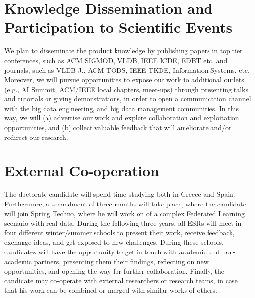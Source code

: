 \documentclass[12pt]{article}
\begin{document}
\section{Knowledge Dissemination and Participation to Scientific Events}

We plan to disseminate the product knowledge by publishing papers in top tier conferences, such as ACM
SIGMOD, VLDB, IEEE ICDE, EDBT etc. and journals, such as VLDB J., ACM TODS, IEEE TKDE,
Information Systems, etc. Moreover, we will pursue opportunities to expose our work to additional
outlets (e.g., AI Summit, ACM/IEEE local chapters, meet-ups) through presenting talks and tutorials or
giving demonstrations, in order to open a communication channel with the big data engineering,
and big data management communities. In this way, we will (a) advertise our work and explore collaboration
and exploitation opportunities, and (b) collect valuable feedback that will ameliorate and/or redirect our
research.



\section{External Co-operation}
The doctorate candidate will spend time studying both in Greece 
and Spain. Furthermore, a secondment of three months will take place, where the candidate will join
Spring Techno, where he will work on of a complex Federated Learning scenario with real data.
During the following three years, all ESRs will meet in four different winter/summer schools to present their work, receive feedback, exchange ideas, and get exposed to new challenges. During these schools, candidates will have the opportunity to get in touch with academic and non-academic partners, presenting them their findings, reflecting on new opportunities, and opening the way for further collaboration. Finally, the candidate may co-operate with external researchers or research teams, in case that his work can be combined or merged with similar works of others.
\end{document}
